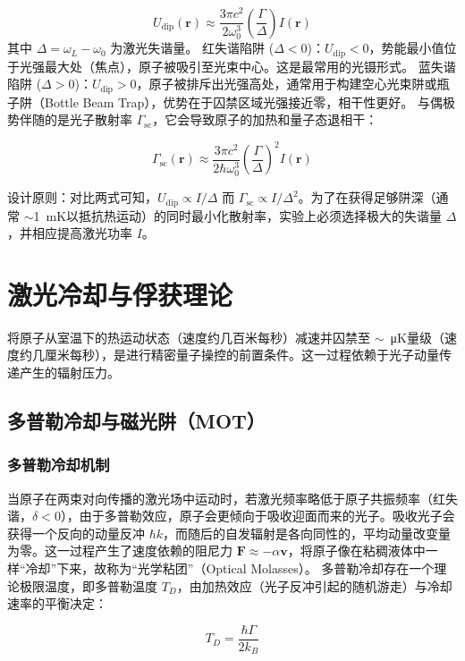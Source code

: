 \documentclass[../main.tex]{subfiles}
\begin{document}
\begin{equation}
U_{\text{dip}}(\mathbf{r}) \approx \frac{3\pi c^2}{2\omega_0^3} \left( \frac{\Gamma}{\Delta} \right) I(\mathbf{r})
\end{equation}
其中 $\Delta = \omega_L - \omega_0$ 为激光失谐量。
红失谐陷阱 ($\Delta < 0$)：$U_{\text{dip}} < 0$，势能最小值位于光强最大处（焦点），原子被吸引至光束中心。这是最常用的光镊形式。
蓝失谐陷阱 ($\Delta > 0$)：$U_{\text{dip}} > 0$，原子被排斥出光强高处，通常用于构建空心光束阱或瓶子阱（Bottle Beam Trap），优势在于囚禁区域光强接近零，相干性更好。
与偶极势伴随的是光子散射率 $\Gamma_{\text{sc}}$，它会导致原子的加热和量子态退相干：

\begin{equation}
\Gamma_{\text{sc}}(\mathbf{r}) \approx \frac{3\pi c^2}{2\hbar\omega_0^3} \left( \frac{\Gamma}{\Delta} \right)^2 I(\mathbf{r})
\end{equation}

设计原则：对比两式可知，$U_{\text{dip}} \propto I/\Delta$ 而 $\Gamma_{\text{sc}} \propto I/\Delta^2$。为了在获得足够阱深（通常 $\sim$\SI{1}{\milli\K}以抵抗热运动）的同时最小化散射率，实验上必须选择极大的失谐量 $\Delta$，并相应提高激光功率 $I$。

\section{激光冷却与俘获理论}
将原子从室温下的热运动状态（速度约几百米每秒）减速并囚禁至 $\sim$\SI{}{\micro\K}量级（速度约几厘米每秒），是进行精密量子操控的前置条件。这一过程依赖于光子动量传递产生的辐射压力。

\subsection{多普勒冷却与磁光阱（MOT）}
\subsubsection{多普勒冷却机制}
当原子在两束对向传播的激光场中运动时，若激光频率略低于原子共振频率（红失谐，$\delta < 0$），由于多普勒效应，原子会更倾向于吸收迎面而来的光子。吸收光子会获得一个反向的动量反冲 $\hbar k$，而随后的自发辐射是各向同性的，平均动量改变量为零。这一过程产生了速度依赖的阻尼力 $\mathbf{F} \approx -\alpha \mathbf{v}$，将原子像在粘稠液体中一样“冷却”下来，故称为“光学粘团”（Optical Molasses）。
多普勒冷却存在一个理论极限温度，即多普勒温度 $T_D$，由加热效应（光子反冲引起的随机游走）与冷却速率的平衡决定：

\begin{equation}
T_D = \frac{\hbar\Gamma}{2k_B}
\end{equation}
\end{document}

